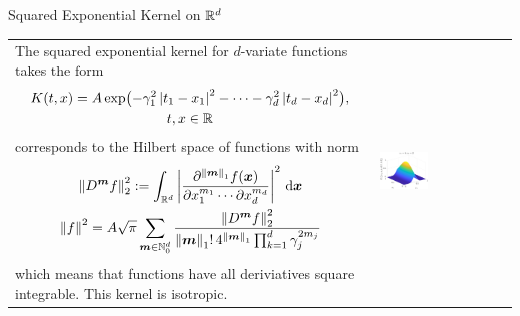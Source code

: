 \documentclass[10pt,compress,xcolor={usenames,dvipsnames},aspectratio=169]{beamer}
\begin{document}
\begin{frame}{Squared Exponential Kernel on $\reals^d$}
\begin{tabular}{m{}m{}}
	The squared exponential kernel for $d$-variate functions takes the form 
	\begin{multline*}
	K(t,x) = A \exp\bigl(-\gamma_1^2\abs{t_1-x_1}^2 - \cdots - \gamma_d^2\abs{t_d-x_d}^2 \bigr) , \\
	 t, x \in \reals
	\end{multline*}
	corresponds to the Hilbert space of functions with norm
	\begin{gather*}
		\norm[2]{D^{\vm} f}^2 := \int_{\reals^d} \abs{\frac{\partial^{\norm[1]{\vm}}f(\vx)}{\partial x_1^{m_1} \cdots \partial x_d^{m_d}}}^2 \, \dif \vx \\
		\norm{f}^2 =  A\sqrt{\pi}  \sum_{\vm \in \natzero^d} \frac{\norm[2]{D^{\vm} f}^2}{\norm[1]{\vm}! \, 4^{\norm[1]{\vm}} \prod_{k=1}^d \gamma_j^{2m_j}}
	\end{gather*}
	which means that functions have all deriviatives square integrable.  This kernel is \alert{isotropic}.
	&
	\includegraphics[width=0.38\textwidth]{RK2-sqexpker.eps}
\end{tabular}

\end{frame}
\end{document}
